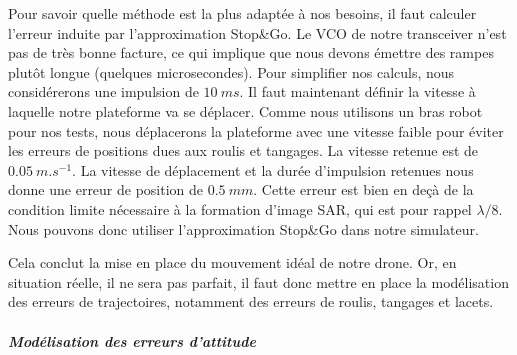 Pour savoir quelle méthode est la plus adaptée à nos besoins, il faut calculer l'erreur induite par l'approximation Stop\&Go. Le VCO de notre transceiver n'est pas de très bonne facture, ce qui implique que nous devons émettre des rampes plutôt longue (quelques microsecondes). Pour simplifier nos calculs, nous considérerons une impulsion de $10~ms$. Il faut maintenant définir la vitesse à laquelle notre plateforme va se déplacer. Comme nous utilisons un bras robot pour nos tests, nous déplacerons la plateforme avec une vitesse faible pour éviter les erreurs de positions dues aux roulis et tangages. La vitesse retenue est de $0.05~m.s^{-1}$. La vitesse de déplacement et la durée d'impulsion retenues nous donne une erreur de position de $0.5~mm$. Cette erreur est bien en deçà de la condition limite nécessaire à la formation d'image SAR, qui est pour rappel $\lambda/8$. Nous pouvons donc utiliser l'approximation Stop\&Go dans notre simulateur.

Cela conclut la mise en place du mouvement idéal de notre drone. Or, en situation réelle, il ne sera pas parfait, il faut donc mettre en place la modélisation des erreurs de trajectoires, notamment des erreurs de roulis, tangages et lacets. 

\subparagraph{Modélisation des erreurs d'attitude}\label{subpar:erreurs_attitude}

